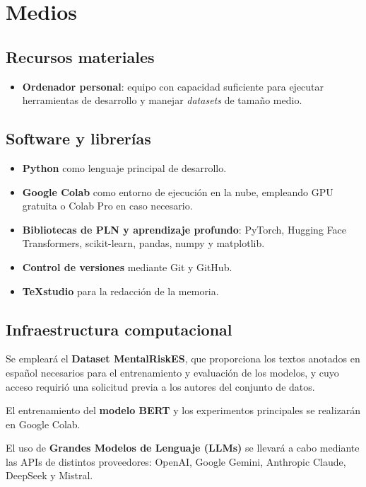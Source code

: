 \documentclass[11pt,a4paper,oneside]{article}
\begin{document}
\section{Medios}
\label{sec:medios}

\subsection{Recursos materiales}

\begin{itemize}
	\item \textbf{Ordenador personal}: equipo con capacidad suficiente para ejecutar herramientas de desarrollo y manejar \textit{datasets} de tamaño medio. 
\end{itemize}

\subsection{Software y librerías}

\begin{itemize}
	\item \textbf{Python} como lenguaje principal de desarrollo.
	\item \textbf{Google Colab} como entorno de ejecución en la nube, empleando GPU gratuita o Colab Pro en caso necesario.
	\item \textbf{Bibliotecas de PLN y aprendizaje profundo}: PyTorch, Hugging Face Transformers, scikit-learn, pandas, numpy y matplotlib.
	\item \textbf{Control de versiones} mediante Git y GitHub.
	\item \textbf{TeXstudio} para la redacción de la memoria.
\end{itemize}

\subsection{Infraestructura computacional}

Se empleará el \textbf{Dataset MentalRiskES}, que proporciona los textos anotados en español necesarios para el entrenamiento y evaluación de los modelos, y cuyo acceso requirió una solicitud previa a los autores del conjunto de datos.

El entrenamiento del \textbf{modelo BERT} y los experimentos principales se realizarán en Google Colab.

El uso de \textbf{Grandes Modelos de Lenguaje (LLMs)} se llevará a cabo mediante las APIs de distintos proveedores: OpenAI, Google Gemini, Anthropic Claude, DeepSeek y Mistral.
\end{document}

